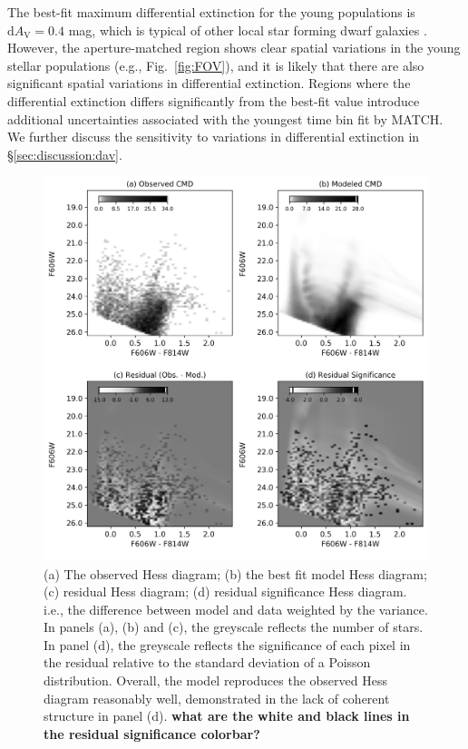 \documentclass[preprint2]{aastex62}
\newcommand{\dAv}{\ensuremath{\mathrm{d}A_{\mathrm{V}}}\xspace}
\begin{document}
The best-fit maximum differential extinction for the young populations is $\dAv = 0.4$ mag, which is typical of other local star forming dwarf galaxies \citep{Weisz+2011}. However, the aperture-matched region shows clear spatial variations in the young stellar populations (e.g., Fig.~\ref{fig:FOV}), and it is likely that there are also significant spatial variations in differential extinction. Regions where the differential extinction differs significantly from the best-fit value introduce additional uncertainties associated with the youngest time bin fit by MATCH. We further discuss the sensitivity to variations in differential extinction in \S\ref{sec:discussion:dav}.

\begin{figure}
  \begin{center}
    \includegraphics[width=\linewidth]{figs/figMATCH.png}
    \caption{(a) The observed Hess diagram; (b) the best fit model Hess diagram; (c) residual Hess diagram; (d) residual significance Hess diagram. i.e., the difference between model and data weighted by the variance. In panels (a), (b) and (c), the greyscale reflects the number of stars. In panel (d), the greyscale reflects the significance of each pixel in the residual relative to the standard deviation of a Poisson distribution. Overall, the model reproduces the observed Hess diagram reasonably well, demonstrated in the lack of coherent structure in panel (d). \textbf{what are the white and black lines in the residual significance colorbar?}}
    \label{fig:matchCMD}
  \end{center}
\end{figure}
\end{document}
